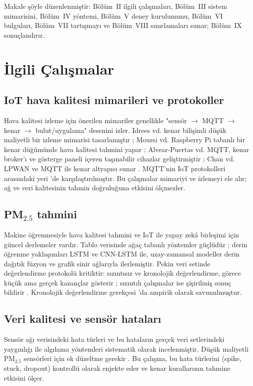 \documentclass[conference]{IEEEtran}
\newcommand{\pmtwo}{PM$_{2.5}$}
\begin{document}
Makale şöyle düzenlenmiştir: Bölüm~II ilgili çalışmaları, Bölüm~III sistem mimarisini, Bölüm~IV yöntemi, Bölüm~V deney kurulumunu, Bölüm~VI bulguları, Bölüm~VII tartışmayı ve Bölüm~VIII sınırlamaları sunar; Bölüm~IX sonuçlandırır.

\section{İlgili Çalışmalar}
\subsection{IoT hava kalitesi mimarileri ve protokoller}
Hava kalitesi izleme için önerilen mimariler genellikle "sensör $\rightarrow$ MQTT $\rightarrow$ kenar $\rightarrow$ bulut/uygulama" desenini izler. Idrees vd. kenar bilişimli düşük maliyetli bir izleme mimarisi tasarlamıştır \cite{R5}; Moursi vd. Raspberry Pi tabanlı bir kenar düğümünde hava kalitesi tahmini yapar \cite{R6}; Alvear-Puertas vd. MQTT, kenar broker'ı ve gösterge paneli içeren taşınabilir cihazlar geliştirmiştir \cite{R18}; Chan vd. LPWAN ve MQTT ile kenar altyapısı sunar \cite{R19}. MQTT'nin IoT protokolleri arasındaki yeri \cite{R7}'de karşılaştırılmıştır. Bu çalışmalar mimariyi ve izlemeyi ele alır; ağ ve veri kalitesinin tahmin doğruluğuna etkisini ölçmezler.

\subsection{\pmtwo{} tahmini}
Makine öğrenmesiyle hava kalitesi tahmini \cite{R3} ve IoT ile yapay zekâ birleşimi \cite{R2} için güncel derlemeler vardır. Tablo verisinde ağaç tabanlı yöntemler güçlüdür \cite{R15,R14,R13}; derin öğrenme yaklaşımları LSTM \cite{R9} ve CNN-LSTM \cite{R10} ile, uzay-zamansal modeller derin dağıtık füzyon \cite{R11} ve grafik sinir ağlarıyla \cite{R12} ilerlemiştir. Pekin veri setinde değerlendirme protokolü kritiktir: sızıntısız ve kronolojik değerlendirme, görece küçük ama gerçek kazançlar gösterir \cite{R13,R14}; sızıntılı çalışmalar ise şişirilmiş sonuç bildirir \cite{R17}. Kronolojik değerlendirme gerekçesi \cite{R16}'da ampirik olarak savunulmuştur.

\subsection{Veri kalitesi ve sensör hataları}
Sensör ağı verisindeki hata türleri \cite{R22} ve bu hataların gerçek veri setlerindeki yaygınlığı ile algılama yöntemleri \cite{R21} sistematik olarak incelenmiştir. Düşük maliyetli \pmtwo{} sensörleri için ek düzeltme gerekir \cite{R20}. Bu çalışma, bu hata türlerini (spike, stuck, dropout) kontrollü olarak enjekte eder ve kenar kurallarının tahmine etkisini ölçer.
\end{document}
